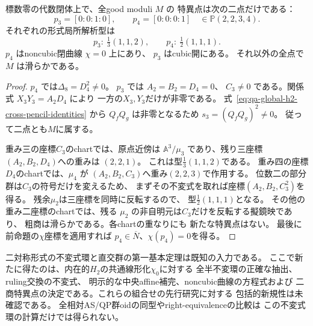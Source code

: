\begin{corollary}[良モジュライの二つの孤立商特異点]
\label{cor:qa-global-h2-two-quotient-singularities}
標数零の代数閉体上で、全good moduli $M$ の
特異点は次の二点だけである：
\[
 p_3=[0:0:1:0],\qquad
 p_4=[0:0:0:1]\quad\in\mathbb P(2,2,3,4).
\]
それぞれの形式局所解析型は
\[
 p_3:\ \tfrac13(1,1,2),\qquad
 p_4:\ \tfrac12(1,1,1).
\]
$p_4$ はnoncubic閉曲線 $\chi=0$ 上にあり、
$p_3$ はcubic開にある。
それ以外の全点で $M$ は滑らかである。
\end{corollary}
\begin{proof}
$p_4$ では$\Delta_8=D_4^2\ne0$。
$p_3$ では $A_2=B_2=D_4=0$、
$C_3\ne0$ である。関係式 $X_3Y_3=A_2D_4$ により
一方の$X_3,Y_3$だけが非零である。
式~\eqref{eq:qa-global-h2-cross-pencil-identities} から
$Q_fQ_g$ は非零となるため
$s_3=(Q_fQ_g)^2\ne0$。
従って二点とも$M$に属する。

重み三の座標$C_3$のchartでは、原点近傍は
$\mathbb A^3/\mu_3$ であり、残り三座標
$(A_2,B_2,D_4)$への重みは $(2,2,1)$。
これは型$\tfrac13(1,1,2)$である。
重み四の座標$D_4$のchartでは、$\mu_4$ が
$(A_2,B_2,C_3)$へ重み$(2,2,3)$で作用する。
位数二の部分群は$C_3$の符号だけを変えるため、
まずその不変式を取れば座標$(A_2,B_2,C_3^2)$を得る。
残余$\mu_2$は三座標を同時に反転するので、
型$\tfrac12(1,1,1)$となる。
その他の重み二座標のchartでは、残る
$\mu_2$ の非自明元は$C_3$だけを反転する擬鏡映であり、
粗商は滑らかである。各chartの重なりにも
新たな特異点はない。
最後に前命題の$\chi$座標を適用すれば
$p_4\in\overline N$、$\chi(p_4)=0$を得る。
\end{proof}

\begin{remark}[新しい環の計算と先行研究の切り分け]
\label{rem:qa-global-h2-invariant-hull-status}
二対称形式の不変式環と直交群の第一基本定理は既知の入力である。
ここで新たに得たのは、内在的$H_2$の共通線形化$\chi_0$に対する
全半不変環の正確な抽出、ruling交換の不変式、
明示的な中央affine補完、noncubic曲線の方程式および
二商特異点の決定である。これらの組合せの先行研究に対する
包括的新規性は未確認である。
全相対AS/QP群oidの同型やright-equivalenceの比較は
この不変式環の計算だけでは得られない。
\end{remark}
